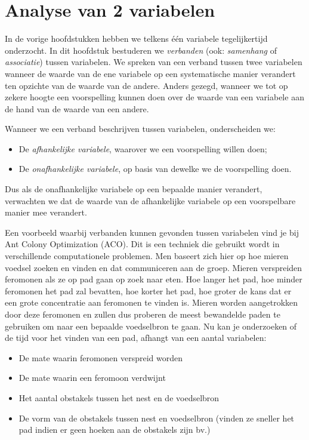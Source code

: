 \chapter{Analyse van 2 variabelen}
\label{ch:analyse2var}

In de vorige hoofdstukken hebben we telkens één variabele tegelijkertijd onderzocht. In dit hoofdstuk bestuderen we \emph{verbanden} (ook: \emph{samenhang} of \emph{associatie}) tussen variabelen. We spreken van een verband tussen twee variabelen wanneer de waarde van de ene variabele op een systematische manier verandert ten opzichte van de waarde van de andere. Anders gezegd, wanneer we tot op zekere hoogte een voorspelling kunnen doen over de waarde van een variabele aan de hand van de waarde van een andere.

Wanneer we een verband beschrijven tussen variabelen, onderscheiden we:

\begin{itemize}
  \item De \emph{afhankelijke variabele}, waarover we een voorspelling willen doen;
  \item De \emph{onafhankelijke variabele}, op basis van dewelke we de voorspelling doen.
\end{itemize}

Dus als de onafhankelijke variabele op een bepaalde manier verandert, verwachten we dat de waarde van de afhankelijke variabele op een voorspelbare manier mee verandert.

\begin{example}
  Een voorbeeld waarbij verbanden kunnen gevonden tussen variabelen vind je bij Ant Colony Optimization (ACO). Dit is een techniek die gebruikt wordt in verschillende computationele problemen. Men baseert zich hier op hoe mieren voedsel zoeken en  vinden en dat communiceren aan de groep. Mieren verspreiden feromonen als ze op pad gaan op zoek naar eten. Hoe langer het pad, hoe minder feromonen het pad zal bevatten, hoe korter het pad, hoe groter de kans dat er een grote concentratie aan feromonen te vinden is. Mieren worden aangetrokken door deze feromonen en zullen dus proberen de meest bewandelde paden te gebruiken om naar een bepaalde voedselbron te gaan. Nu kan je onderzoeken of de tijd voor het vinden van een pad, afhangt van een aantal variabelen:

  \begin{itemize}
    \item De mate waarin feromonen verspreid worden
    \item De mate waarin een feromoon verdwijnt
    \item Het aantal obstakels tussen het nest en de voedselbron
    \item De vorm van de obstakels tussen nest en voedselbron (vinden ze sneller het pad indien er geen hoeken aan de obstakels zijn bv.)
  \end{itemize}
\end{example}

